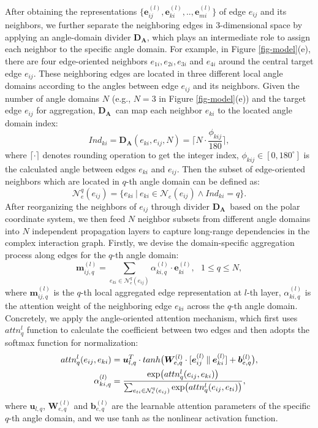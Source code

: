 \documentclass[sigconf]{acmart}
\newcommand{\angleD}{\ensuremath{\bm{D_A}}}
\newcommand{\cat}{\ensuremath{\mathbin\Vert}}
\begin{document}
After obtaining the representations $\{\bm{e}_{ij}^{(l)},\bm{e}_{ki}^{(l)},..,\bm{e}_{mi}^{(l)}\}$ of edge $e_{ij}$ and its neighbors, we further separate the neighboring edges in 3-dimensional space by applying an angle-domain divider \angleD, which plays an intermediate role to assign each neighbor to the specific angle domain. For example, in Figure \ref{fig-model}(e)\hide{\ref{fig-angle}}, there are four edge-oriented neighbors $e_{1i},e_{2i},e_{3i}$ and $e_{4i}$ around the central target edge $e_{ij}$. These neighboring edges are located in three different local angle domains according to the angles between edge $e_{ij}$ and its neighbors. Given the number of angle domains $N$ (e.g., $N=3$ in Figure \ref{fig-model}(e)) and the target edge $e_{ij}$ for aggregation, \angleD \  can map each neighbor $e_{ki}$ to the located angle domain index:
\begin{equation}
\label{eq-angle-index}
    Ind_{ki} = \angleD(e_{ki},e_{ij},N) = \lceil N \cdot \frac{\phi_{kij}}{180} \rceil,
\end{equation}
where $\lceil \cdot \rceil$ denotes rounding operation to get the integer index, $\phi_{kij} \in [0, 180^{\circ}]$ is the calculated angle between edges $e_{ki}$ and $e_{ij}$. Then the subset of edge-oriented neighbors which are located in $q$-th angle domain can be defined as:
\begin{equation}
\label{eq-angle-neighbor}
    \mathcal{N}^{q}_{e}(e_{ij}) = \{e_{ki} \ | \ e_{ki} \in \mathcal{N}_{e}(e_{ij}) \land Ind_{ki}=q\}.
\end{equation}
After reorganizing the neighbors of $e_{ij}$ through divider \angleD\  based on the polar coordinate system, we then feed $N$ neighbor subsets from different angle domains into $N$ independent propagation layers to capture long-range dependencies in the complex interaction graph. Firstly, we devise the domain-specific aggregation process along edges for the $q$-th angle domain:
\begin{equation}
\label{eq-e2e}
    \bm{m}^{(l)}_{ij,q} = \sum_{e_{ki} \in \mathcal{N}^{q}_{e}(e_{ij})} \alpha^{(l)}_{ki,q} \cdot \bm{e}^{(l)}_{ki}, \ \ \  1 \le q \le N,
\end{equation}
where $\bm{m}^{(l)}_{ij,q}$ is the $q$-th local aggregated edge representation at $l$-th layer, $\alpha^{(l)}_{ki,q}$ is the attention weight of the neighboring edge $e_{ki}$ across the $q$-th angle domain. Concretely, we apply the angle-oriented attention mechanism, which first uses $attn_q^l$ function to calculate the coefficient between two edges and then adopts the softmax function for normalization:
\begin{align}
\label{eq-e2e-attn}
    attn_q^l(e_{ij},e_{ki}) &= \bm{u}^T_{l,q} \cdot tanh \big(\bm{W}^{(l)}_{e, q}\cdot [\bm{e}^{(l)}_{ij} \cat \bm{e}^{(l)}_{ki}] + \bm{b}^{(l)}_{e, q} \big),
    \\
    \alpha^{(l)}_{ki,q} &= \frac{{\rm exp}\big(attn_q^l(e_{ij},e_{ki})\big)}{\sum_{e_{ti} \in \mathcal{N}^{q}_{e}(e_{ij})} {\rm exp}\big(attn_q^l(e_{ij},e_{ti})\big)},
\end{align}
where $\bm{u}_{l,q}$, $\bm{W}^{(l)}_{e, q}$ and $\bm{b}^{(l)}_{e, q}$ are the learnable attention parameters of the specific $q$-th angle domain, and we use tanh as the nonlinear activation function.
\end{document}
